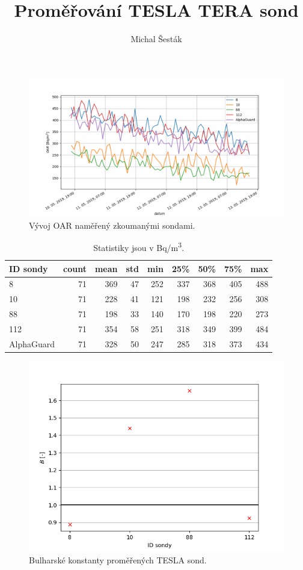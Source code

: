 \documentclass[11pt,a4paper]{article}
\author{Michal Šesták}
\title{Proměřování TESLA TERA sond}
\begin{document}
	\maketitle
	\begin{figure}[ht]
		\includegraphics[width=\textwidth]{sondy.png}
		\caption{Vývoj OAR naměřený zkoumanými sondami.}
	\end{figure}
	\begin{table}[ht]
		\centering
		\caption{Statistiky jsou v \si{Bq/m^3}.}
\begin{tabular}{lrrrrrrrr}
	\toprule
	ID sondy &  count &  mean &  std &  min &  25\% &  50\% &  75\% &  max \\
	\midrule
	8          &     71 &   369 &   47 &  252 &  337 &  368 &  405 &  488 \\
	10         &     71 &   228 &   41 &  121 &  198 &  232 &  256 &  308 \\
	88         &     71 &   198 &   33 &  140 &  170 &  198 &  220 &  273 \\
	112        &     71 &   354 &   58 &  251 &  318 &  349 &  399 &  484 \\
	\midrule
	AlphaGuard &     71 &   328 &   50 &  247 &  285 &  318 &  373 &  434 \\
	\bottomrule
\end{tabular}
	\end{table}
\begin{figure}
	\centering
	\includegraphics[width=0.7\linewidth]{B}
	\caption{Bulharské konstanty proměřených TESLA sond.}
	\label{fig:B}
\end{figure}
\end{document}
